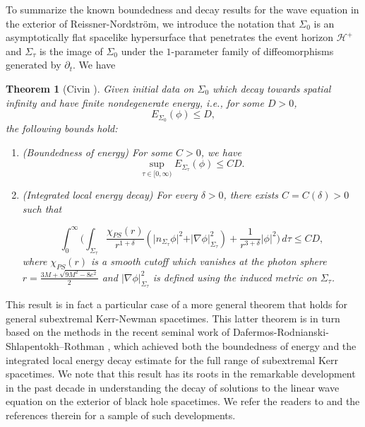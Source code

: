 \documentclass[12 pt, reqno]{amsart}
\newtheorem{theorem}{Theorem}[section]
\theoremstyle{definition}
\theoremstyle{remark}
\numberwithin{equation}{section}
\newcommand{\abs}[1]{\vert#1\vert}
\newcommand{\ud}{d}
\newcommand{\rd}{\partial}
\newcommand{\nb}{\nabla}
\newcommand{\bb}{\Big}
\newcommand{\0}{\emptyset}
\newcommand{\dlt}{\delta}
\newcommand{\Sgm}{\Sigma}
\newcommand{\f}{\frac}
\begin{document}
To summarize the known boundedness and decay results for the wave equation in the exterior of Reissner-Nordstr\"om, we introduce the notation that $\Sigma_0$ is an asymptotically flat spacelike hypersurface that penetrates the event horizon $\mathcal H^+$ and $\Sigma_\tau$ is the image of $\Sigma_0$ under the $1$-parameter family of diffeomorphisms generated by $\rd_t$. We have 
\begin{theorem}[Civin \cite{Civin}]\label{thm:Civin}
Given initial data on $\Sigma_0$ which decay towards spatial infinity and have finite nondegenerate energy, i.e., for some $D>0$,
$$E_{\Sigma_0}(\phi)\leq D,$$ 
the following bounds hold:
\begin{enumerate}
\item (Boundedness of energy) For some $C>0$, we have
$$\sup_{\tau\in [0,\infty)} E_{\Sigma_\tau}(\phi) \leq CD.$$
\item (Integrated local energy decay) For every $\delta>0$, there exists $C=C(\delta)>0$ such that

\begin{equation*}
	\int_{0}^{\infty} \bb( \int_{\Sgm_{\tau}} \frac{\chi_{PS}(r)}{r^{1+\dlt}}(\abs{n_{\Sgm_{\tau}} \phi}^{2} +\abs{\nb \phi}_{\Sgm_{\tau}}^{2}) + \frac{1}{r^{3+\dlt}} \abs{\phi}^{2} \bb) \, \ud \tau \leq C D,
\end{equation*}
where $\chi_{PS}(r)$ is a smooth cutoff which vanishes at the photon sphere $r=\f{3M+\sqrt{9M^2-8e^2}}{2}$ and $\abs{\nb \phi}_{\Sgm_{\tau}}^{2}$ is defined using the induced metric on $\Sgm_{\tau}$.
\end{enumerate}
\end{theorem}

This result is in fact a particular case of a more general theorem that holds for general subextremal Kerr-Newman spacetimes. This latter theorem is in turn based on the methods in the recent seminal work of Dafermos-Rodnianski-Shlapentokh--Rothman \cite{DRSR}, which achieved both the boundedness of energy and the integrated local energy decay estimate for the full range of subextremal Kerr spacetimes. We note that this result has its roots in the remarkable development in the past decade in understanding the decay of solutions to the linear wave equation on the exterior of black hole spacetimes. We refer the readers to \cite{AB, BSt, DRK, DRL, DRS, DRSub1, DRSub2, KW, MMTT, TT} and the references therein for a sample of such developments.
\end{document}
